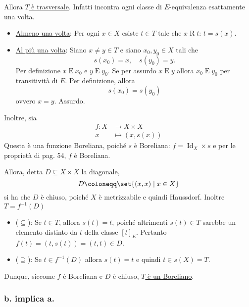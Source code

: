 \documentclass{article}
\newcommand{\1}{\mathds{1}}
\begin{document}
Allora \uline{\(T\) è trasversale}. Infatti incontra ogni classe di \(E\)-equivalenza esattamente una volta.
\begin{itemize}
\item \uline{Almeno una volta}: Per ogni \(x \in X\) esiste \(t \in T\) tale che \(x\mathrel{R}t\): \(t=s(x)\).
\item \uline{Al più una volta}: Siano \(x\neq y \in T\) e siano \(x_{0},y_{0} \in X\) tali che
\begin{equation*}
  s(x_{0})=x,\quad s(y_{0})=y.
\end{equation*}
Per definizione \(x\mathrel{E}x_{0}\) e \(y\mathrel{E}y_{0}\). Se per assurdo \(x\mathrel{E}y\) allora \(x_{0}\mathrel{E}y_{0}\) per transitività di \(E\). Per definizione, allora
\begin{equation*}
  s(x_{0}) = s(y_{0})
\end{equation*}
ovvero \(x=y\). Assurdo.
\end{itemize}

Inoltre, sia
\begin{align*}
f: X &\longrightarrow X\times X\\
x &\longmapsto \left(x,s(x)\right)
\end{align*}
Questa è una funzione Boreliana, poiché \(s\) è Boreliana: \(f=\operatorname{Id}_{X}\times s\) e per le proprietà di pag. 54, \(f\) è Boreliana.

Allora, detta \(D \subseteq X\times X\) la diagonale,
\begin{equation*}
D\coloneqq\set{(x,x)\mid x \in X}
\end{equation*}
si ha che \(D\) è chiuso, poiché \(X\) è metrizzabile e quindi Haussdorf. Inoltre \(T=f^{-1}(D)\)
\begin{itemize}
\item (\(\subseteq\)): Se \(t \in T\), allora \(s(t)=t\), poiché altrimenti \(s(t) \in T\) sarebbe un elemento distinto da \(t\) della classe \([t]_{E}\). Pertanto \(f(t) = \left(t,s(t)\right) = (t,t) \in D\).
\item (\(\supseteq\)): Se \(t \in f^{-1}(D)\) allora \(s(t)=t\) e quindi \(t \in s(X) = T\).
\end{itemize}

Dunque, siccome \(f\) è Boreliana e \(D\) è chiuso, \uline{\(T\) è un Boreliano}.
\subsubsection{b. implica a.}
\label{sec:orgda48351}
\end{document}
